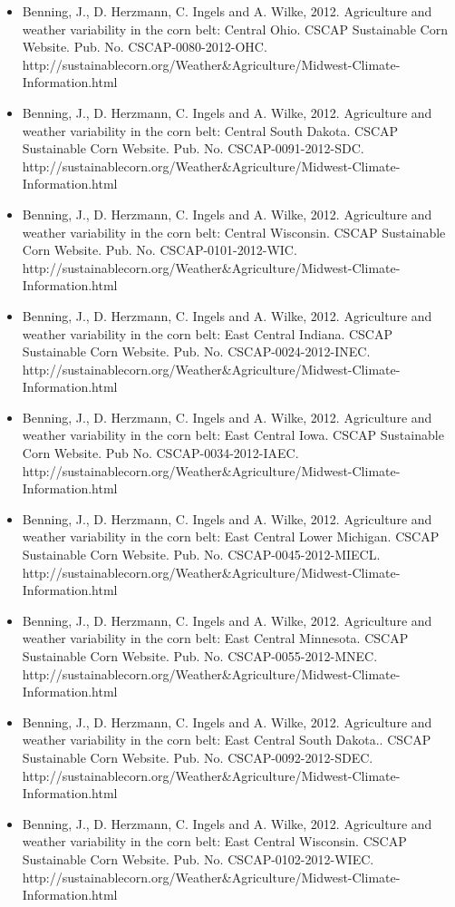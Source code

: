 \begin{itemize}
\item Benning, J., D. Herzmann, C. Ingels and A. Wilke, 2012. Agriculture and weather variability in the corn belt: Central Ohio. CSCAP Sustainable Corn Website. Pub. No. CSCAP-0080-2012-OHC. http://sustainablecorn.org/Weather\&Agriculture/Midwest-Climate-Information.html
\item Benning, J., D. Herzmann, C. Ingels and A. Wilke, 2012. Agriculture and weather variability in the corn belt: Central South Dakota. CSCAP Sustainable Corn Website. Pub. No. CSCAP-0091-2012-SDC. http://sustainablecorn.org/Weather\&Agriculture/Midwest-Climate-Information.html
\item Benning, J., D. Herzmann, C. Ingels and A. Wilke, 2012. Agriculture and weather variability in the corn belt: Central Wisconsin. CSCAP Sustainable Corn Website. Pub. No. CSCAP-0101-2012-WIC. http://sustainablecorn.org/Weather\&Agriculture/Midwest-Climate-Information.html
\item Benning, J., D. Herzmann, C. Ingels and A. Wilke, 2012. Agriculture and weather variability in the corn belt: East Central Indiana. CSCAP Sustainable Corn Website. Pub. No. CSCAP-0024-2012-INEC. http://sustainablecorn.org/Weather\&Agriculture/Midwest-Climate-Information.html
\item Benning, J., D. Herzmann, C. Ingels and A. Wilke, 2012. Agriculture and weather variability in the corn belt: East Central Iowa. CSCAP Sustainable Corn Website. Pub No. CSCAP-0034-2012-IAEC. http://sustainablecorn.org/Weather\&Agriculture/Midwest-Climate-Information.html
\item Benning, J., D. Herzmann, C. Ingels and A. Wilke, 2012. Agriculture and weather variability in the corn belt: East Central Lower Michigan. CSCAP Sustainable Corn Website. Pub. No. CSCAP-0045-2012-MIECL. http://sustainablecorn.org/Weather\&Agriculture/Midwest-Climate-Information.html
\item Benning, J., D. Herzmann, C. Ingels and A. Wilke, 2012. Agriculture and weather variability in the corn belt: East Central Minnesota. CSCAP Sustainable Corn Website. Pub. No. CSCAP-0055-2012-MNEC. http://sustainablecorn.org/Weather\&Agriculture/Midwest-Climate-Information.html
\item Benning, J., D. Herzmann, C. Ingels and A. Wilke, 2012. Agriculture and weather variability in the corn belt: East Central South Dakota.. CSCAP Sustainable Corn Website. Pub. No. CSCAP-0092-2012-SDEC. http://sustainablecorn.org/Weather\&Agriculture/Midwest-Climate-Information.html
\item Benning, J., D. Herzmann, C. Ingels and A. Wilke, 2012. Agriculture and weather variability in the corn belt: East Central Wisconsin. CSCAP Sustainable Corn Website. Pub. No. CSCAP-0102-2012-WIEC. http://sustainablecorn.org/Weather\&Agriculture/Midwest-Climate-Information.html

\end{itemize}
